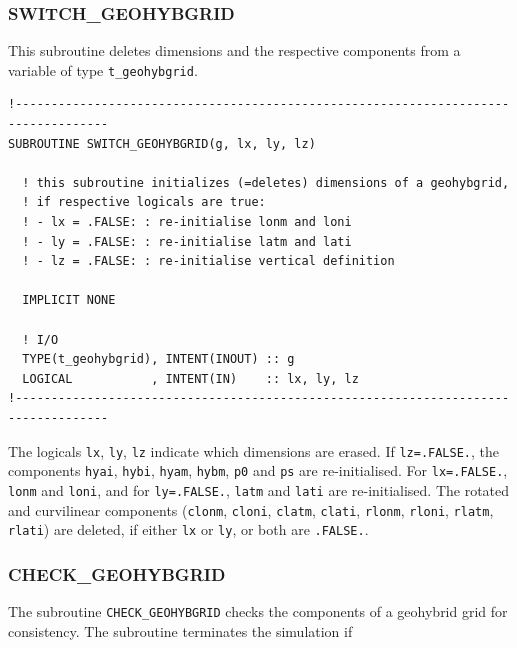 \documentclass[11pt,twoside]{article}
\begin{document}
\subsubsection{SWITCH\_GEOHYBGRID\label{SWITCHGRID}}
This subroutine deletes dimensions and the respective components from
a variable of type \verb|t_geohybgrid|.
\begin{verbatim}
!-----------------------------------------------------------------------------------
SUBROUTINE SWITCH_GEOHYBGRID(g, lx, ly, lz)

  ! this subroutine initializes (=deletes) dimensions of a geohybgrid,
  ! if respective logicals are true:
  ! - lx = .FALSE: : re-initialise lonm and loni
  ! - ly = .FALSE: : re-initialise latm and lati
  ! - lz = .FALSE: : re-initialise vertical definition

  IMPLICIT NONE

  ! I/O
  TYPE(t_geohybgrid), INTENT(INOUT) :: g
  LOGICAL           , INTENT(IN)    :: lx, ly, lz
!-----------------------------------------------------------------------------------
\end{verbatim}
The logicals \verb|lx|, \verb|ly|, \verb|lz| indicate which dimensions are
erased.
If \verb|lz=.FALSE.|, the components \verb|hyai|, \verb|hybi|, \verb|hyam|,
 \verb|hybm|, \verb|p0| and \verb|ps| are re-initialised.
For \verb|lx=.FALSE.|, \verb|lonm| and  \verb|loni|, and for
\verb|ly=.FALSE.|, \verb|latm| and  \verb|lati| are re-initialised.
The rotated and curvilinear components (\verb|clonm|, \verb|cloni|,
 \verb|clatm|, \verb|clati|, \verb|rlonm|, \verb|rloni|, \verb|rlatm|,
 \verb|rlati|) are deleted, if either \verb|lx| or
\verb|ly|, or both are \verb|.FALSE.|.


\subsubsection{CHECK\_GEOHYBGRID\label{CHECKGRID}}
The subroutine \verb|CHECK_GEOHYBGRID| checks the components of a 
geohybrid grid for consistency. 
The subroutine terminates the simulation if
\end{document}
